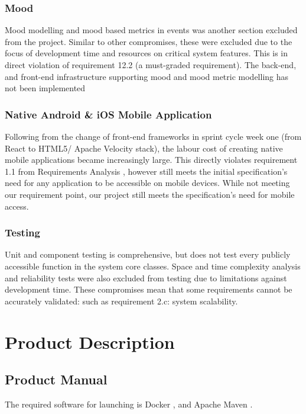 \documentclass[9pt, titlepage]{extarticle}
\begin{document}
\subsubsection{Mood}

Mood modelling and mood based metrics in events was another section excluded from the project. Similar to other compromises, these were excluded due to the focus of development time and resources on critical system features. This is in direct violation of requirement 12.2 (a must-graded requirement). The back-end, and front-end infrastructure supporting mood and mood metric modelling has not been implemented

\subsubsection{Native Android \& iOS Mobile Application}

Following from the change of front-end frameworks in sprint cycle week one (from React to HTML5/ Apache Velocity stack), the labour cost of creating native mobile applications became increasingly large. This directly violates requirement 1.1 from Requirements Analysis \cite{requirements-analysis}, however still meets the initial specification's need for any application to be accessible on mobile devices. While not meeting our requirement point, our project still meets the specification's need for mobile access.

\subsubsection{Testing}

Unit and component testing is comprehensive, but does not test every publicly accessible function in the system core classes. Space and time complexity analysis and reliability tests were also excluded from testing due to limitations against development time. These compromises mean that some requirements cannot be accurately validated: such as requirement 2.c: system scalability.

\section{Product Description}
\subsection{Product Manual}

The required software for launching is Docker \cite{docker}, and Apache Maven \cite{maven}. \\
\end{document}
